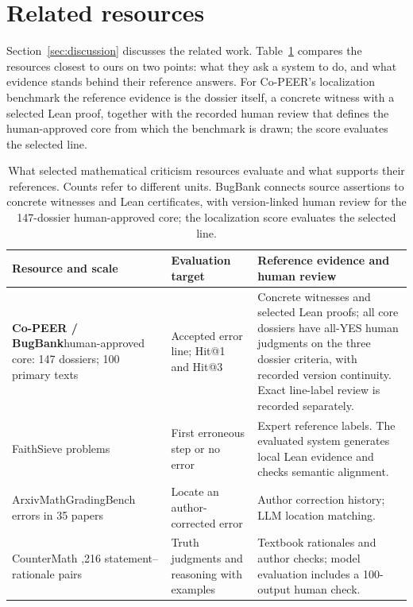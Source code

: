 \section{Related resources}
\label{sec:related}

Section~\ref{sec:discussion} discusses the related work. Table~\ref{tab:related} compares the resources closest to ours on two points: what they ask a system to do, and what evidence stands behind their reference answers. For Co-PEER's localization benchmark the reference evidence is the dossier itself, a concrete witness with a selected Lean proof, together with the recorded human review that defines the human-approved core from which the benchmark is drawn; the score evaluates the selected line.

\begin{table}[t]
\centering\small
\setlength{\tabcolsep}{3pt}
\caption{What selected mathematical criticism resources evaluate and what supports their references. Counts refer to different units. BugBank connects source assertions to concrete witnesses and Lean certificates, with version-linked human review for the 147-dossier human-approved core; the localization score evaluates the selected line.}
\label{tab:related}
\begin{tabular}{@{}>{\raggedright\arraybackslash}p{3.0cm}>{\raggedright\arraybackslash}p{4.0cm}>{\raggedright\arraybackslash}p{6.3cm}@{}}
\toprule
Resource and scale & Evaluation target & Reference evidence and human review \\
\midrule
\textbf{Co-PEER / BugBank}\newline human-approved core: 147 dossiers; 100 primary texts & Accepted error line; Hit@1 and Hit@3 & Concrete witnesses and selected Lean proofs; all core dossiers have all-YES human judgments on the three dossier criteria, with recorded version continuity. Exact line-label review is recorded separately. \\
\addlinespace
FaithSieve \citep{wang2026faithsieve}\newline 550 problems & First erroneous step or no error & Expert reference labels. The evaluated system generates local Lean evidence and checks semantic alignment. \\
\addlinespace
Arxiv\-Math\-Grading\-Bench \citep{barkallah2026pseudo}\newline 40 errors in 35 papers & Locate an author-corrected error & Author correction history; LLM location matching. \\
\addlinespace
CounterMath \citep{li2025countermath}\newline 1,216 statement--rationale pairs & Truth judgments and reasoning with examples & Textbook rationales and author checks; model evaluation includes a 100-output human check. \\

\end{tabular}
\end{table}
